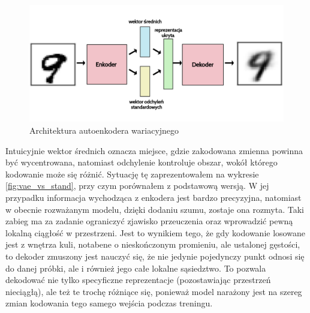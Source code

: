 \begin{figure}[h!]
    \centering
    \includegraphics[width=1.0\textwidth]{images/vae}
    \caption{Architektura autoenkodera wariacyjnego}
    \label{fig:vae_model}
\end{figure}

Intuicyjnie wektor średnich oznacza miejsce, gdzie zakodowana zmienna powinna być wycentrowana, natomiast odchylenie kontroluje obszar, wokół którego kodowanie może się różnić. Sytuację tę zaprezentowałem na wykresie \ref{fig:vae_vs_stand}, przy czym porównałem z podstawową wersją. W jej przypadku informacja wychodząca z enkodera jest bardzo precyzyjna, natomiast w obecnie rozważanym modelu, dzięki dodaniu szumu, zostaje ona rozmyta. Taki zabieg ma za zadanie ograniczyć zjawisko przeuczenia oraz wprowadzić pewną lokalną ciągłość w przestrzeni. Jest to wynikiem tego, że gdy kodowanie losowane jest z wnętrza kuli, notabene o nieskończonym promieniu, ale ustalonej gęstości, to dekoder zmuszony jest nauczyć się, że nie jedynie pojedynczy punkt odnosi się do danej próbki, ale i również jego całe lokalne sąsiedztwo. To pozwala dekodować nie tylko specyficzne reprezentacje (pozostawiając przestrzeń nieciągłą), ale też te trochę różniące się, ponieważ model narażony jest na szereg zmian kodowania tego samego wejścia podczas treningu.

